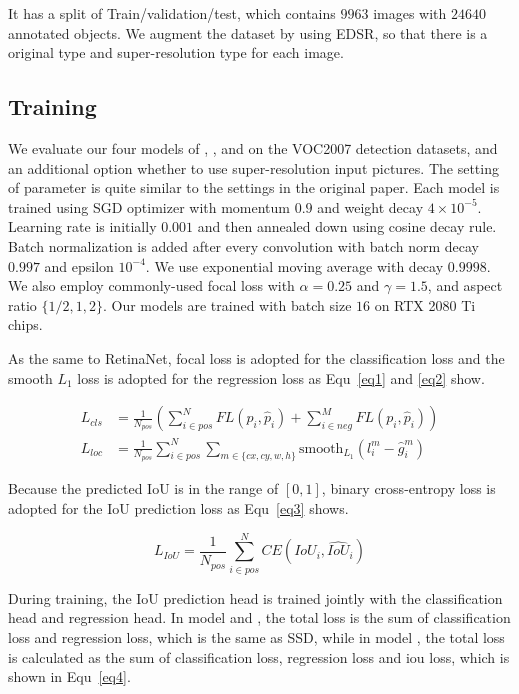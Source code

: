 \documentclass[journal,conference]{IEEEtran}
\begin{document}
It has a split of Train/validation/test, which contains $9963$ images with $24640$ annotated objects. We augment the dataset by using EDSR, so that there is a original type and super-resolution type for each image.

\subsection{Training}
We evaluate our four models of , , and  on the VOC2007 detection datasets, and an additional option whether to use super-resolution input pictures. The setting of parameter is quite similar to the settings in the original paper. Each model is trained using SGD optimizer with momentum $0.9$ and weight decay $4\times 10^{-5}$.  Learning rate is initially $0.001$ and then annealed down using cosine decay rule. Batch normalization is added after every convolution with batch norm decay $0.997$ and epsilon $10^{-4}$. We use exponential moving average with decay $0.9998$. We also employ commonly-used focal loss with $\alpha = 0.25$ and $\gamma= 1.5$, and aspect ratio $\{1/2, 1, 2\}$. Our models are trained with batch size $16$ on RTX 2080 Ti chips.

As the same to RetinaNet, focal loss is adopted for the classification loss and the smooth $L_1$ loss is adopted for the regression loss as Equ~\eqref{eq1} and \eqref{eq2} show.

\begin{align}
  L_{cls} & =\frac{1}{N_{pos}}\left(\sum_{i\in pos}^N FL(p_i,\hat{p}_i)+\sum_{i\in neg}^M FL(p_i,\hat{p}_i)\right)\label{eq1} \\
  L_{loc} & =\frac{1}{N_{pos}}\sum_{i\in pos}^N \sum_{m\in \{cx,cy,w,h\}} \text{smooth}_{L_1}(l_i^m-\hat{g}_i^m)\label{eq2}
\end{align}

Because the predicted IoU is in the range of $[0,1]$, binary cross-entropy loss is adopted for the IoU prediction loss as Equ~\eqref{eq3} shows.

\begin{equation}
  L_{IoU}=\frac{1}{N_{pos}}\sum_{i\in pos}^N CE(IoU_i,\hat{IoU}_i)\label{eq3}
\end{equation}

During training, the IoU prediction head is trained jointly with the classification head and regression head. In model  and , the total loss is the sum of classification loss and regression loss, which is the same as SSD, while in model , the total loss is calculated as the sum of classification loss, regression loss and iou loss, which is shown in Equ~\eqref{eq4}.
\end{document}
